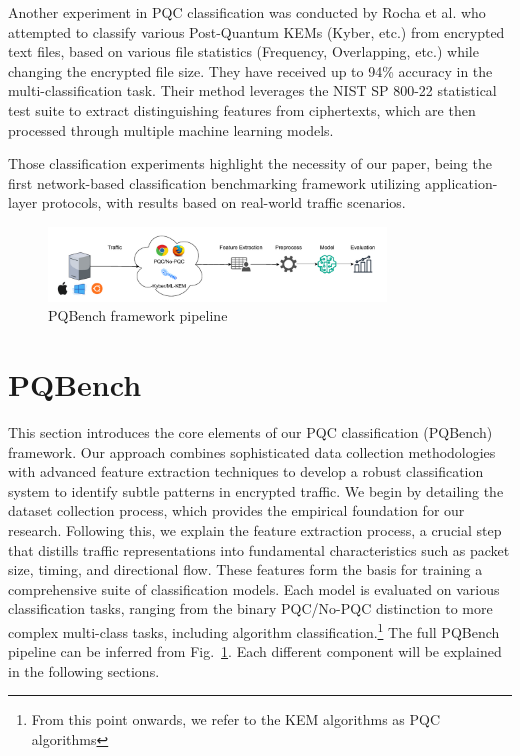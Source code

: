 \documentclass[10pt,journal]{IEEEtran}%
\begin{document}
Another experiment in PQC classification was conducted by Rocha et al. \cite{rocha2022} who attempted to classify various Post-Quantum KEMs (Kyber, etc.) from encrypted text files, based on various file statistics (Frequency, Overlapping, etc.) while changing the encrypted file size. They have received up to 94\% accuracy in the multi-classification task. Their method leverages the NIST SP 800-22 statistical test suite to extract distinguishing features from ciphertexts, which are then processed through multiple machine learning models.

Those classification experiments highlight the necessity of our paper, being the first network-based classification benchmarking framework utilizing application-layer protocols, with results based on real-world traffic scenarios.

\begin{figure}[htbp]
\centering
\includegraphics[width=0.8\textwidth]{PQBenchFramework.pdf}
    \caption{PQBench framework pipeline}
    \label{fig:pqbench}
\end{figure}

\section{PQBench}
\label{sec:frame}
This section introduces the core elements of our PQC classification (PQBench) framework. Our approach combines sophisticated data collection methodologies with advanced feature extraction techniques to develop a robust classification system to identify subtle patterns in encrypted traffic. We begin by detailing the dataset collection process, which provides the empirical foundation for our research. Following this, we explain the feature extraction process, a crucial step that distills traffic representations into fundamental characteristics such as packet size, timing, and directional flow. These features form the basis for training a comprehensive suite of classification models. Each model is evaluated on various classification tasks, ranging from the binary PQC/No-PQC distinction to more complex multi-class tasks, including algorithm classification.\footnote{From this point onwards, we refer to the KEM algorithms as PQC algorithms}
The full PQBench pipeline can be inferred from Fig.~\ref{fig:pqbench}. Each different component will be explained in the following sections.
\end{document}

